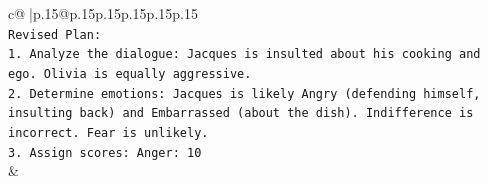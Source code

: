 \documentclass{article}
\begin{document}
{\begin{supertabular}{c@{$\;$}|p{.15\linewidth}@{}p{.15\linewidth}p{.15\linewidth}p{.15\linewidth}p{.15\linewidth}p{.15\linewidth}}
{{{\\ 
\texttt{Revised Plan:} \\
\texttt{1. Analyze the dialogue: Jacques is insulted about his cooking and ego. Olivia is equally aggressive.} \\
\texttt{2. Determine emotions: Jacques is likely Angry (defending himself, insulting back) and Embarrassed (about the dish). Indifference is incorrect. Fear is unlikely.} \\
\texttt{3. Assign scores: Anger: 10} \\
            }
        }
    }
    & \\ \\

\end{supertabular}
}
\end{document}

